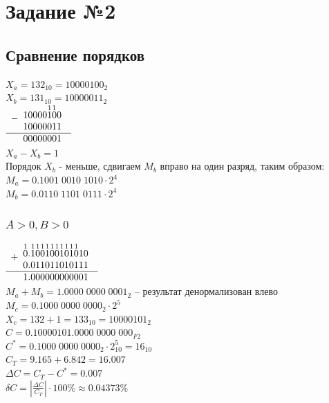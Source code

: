 \documentclass[12pt,a4paper]{report}
\begin{document}
\section*{Задание №2}
\subsection*{Сравнение порядков}
$X_a=132_10=10000100_2$\\
$X_b=131_10=10000011_2$\\
\hfill\break
$
    \begin{array}{r}
    -
    \begin{array}{r}
    10000\overset{\small{1}}{1}\overset{\small{1}}{0}0\\
    10000011
    \end{array}\\
    \hline
    \begin{array}{r}
    00000001
    \end{array}\\
    \end{array}
$\\
\hfill\break
$X_a-X_b=1$\\
Порядок $X_b$ - меньше, сдвигаем $M_b$ вправо на один разряд, таким образом:\\
$M_a=0.1001\;0010\;1010\cdot2^4$\\
$M_b=0.0110\;1101\;0111\cdot2^4$
\subsubsection*{$A>0, B>0$}
$
    \begin{array}{r}
    +
    \begin{array}{r}
    \overset{\small{1}}{0}.\overset{\small{1}}{1}\overset{\small{1}}{0}\overset{\small{1}}{0}\overset{\small{1}}{1}\overset{\small{1}}{0}\overset{\small{1}}{0}\overset{\small{1}}{1}\overset{\small{1}}{0}\overset{\small{1}}{1}\overset{\small{1}}{0}10\\
    0.011011010111
    \end{array}\\
    \hline
    \begin{array}{r}
    1.000000000001
    \end{array}\\
    \end{array}
$\\
\hfill\break
$M_a+M_b=1.0000\;0000\;0001_2$ -- результат денормализован влево\\
$M_c=0.1000\;0000\;0000_2\cdot 2^5$\\
$X_c=132+1=133_{10}=10000101_2$\\
$C=0.10000101.0000\;0000\;000_{F2}$\\
$C^*=0.1000\;0000\;0000_2\cdot2_{10}^5=16_{10}$\\
$C_T=9.165+6.842=16.007$\\
$\Delta C=C_T-C^*=0.007$\\
$\delta C=|\frac{\Delta C}{C_T}|\cdot100\%\approx0.04373\%$
\end{document}
